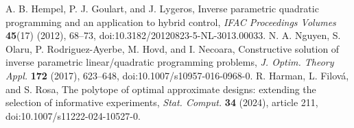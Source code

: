  A. B. Hempel, P. J. Goulart, and J. Lygeros,
Inverse parametric quadratic programming and an application to hybrid control,
\emph{IFAC Proceedings Volumes} \textbf{45}(17) (2012), 68--73,
doi:10.3182/20120823-5-NL-3013.00033.
 N. A. Nguyen, S. Olaru, P. Rodriguez-Ayerbe, M. Hovd, and I. Necoara,
Constructive solution of inverse parametric linear/quadratic programming problems,
\emph{J. Optim. Theory Appl.} \textbf{172} (2017), 623--648,
doi:10.1007/s10957-016-0968-0.
 R. Harman, L. Filov\'a, and S. Rosa,
The polytope of optimal approximate designs: extending the selection of informative experiments,
\emph{Stat. Comput.} \textbf{34} (2024), article 211,
doi:10.1007/s11222-024-10527-0.
